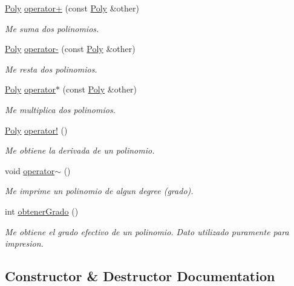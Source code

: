 \begin{DoxyCompactItemize}
\item 
\hyperlink{class_poly}{Poly} \hyperlink{class_poly_a844187f2e350f9691b8da7b0035911e3}{operator+} (const \hyperlink{class_poly}{Poly} \&other)
\begin{DoxyCompactList}\small\item\em Me suma dos polinomios. \end{DoxyCompactList}\item 
\hyperlink{class_poly}{Poly} \hyperlink{class_poly_adb5e47086466c0fa979dff6dd536ea84}{operator-\/} (const \hyperlink{class_poly}{Poly} \&other)
\begin{DoxyCompactList}\small\item\em Me resta dos polinomios. \end{DoxyCompactList}\item 
\hyperlink{class_poly}{Poly} \hyperlink{class_poly_a4d30f14487a161434adeb78e93f3553a}{operator$\ast$} (const \hyperlink{class_poly}{Poly} \&other)
\begin{DoxyCompactList}\small\item\em Me multiplica dos polinomios. \end{DoxyCompactList}\item 
\hyperlink{class_poly}{Poly} \hyperlink{class_poly_af4a69f7d44d49128060cd4a60e57828b}{operator!} ()
\begin{DoxyCompactList}\small\item\em Me obtiene la derivada de un polinomio. \end{DoxyCompactList}\item 
void \hyperlink{class_poly_a57652b6c2c253ce3f42976988baeb03a}{operator$\sim$} ()
\begin{DoxyCompactList}\small\item\em Me imprime un polinomio de algun degree (grado). \end{DoxyCompactList}\item 
int \hyperlink{class_poly_a5ccdd1385c09a01943cbd6d78ebb7585}{obtener\+Grado} ()
\begin{DoxyCompactList}\small\item\em Me obtiene el grado efectivo de un polinomio. Dato utilizado puramente para impresion. \end{DoxyCompactList}\end{DoxyCompactItemize}


\subsection{Constructor \& Destructor Documentation}
